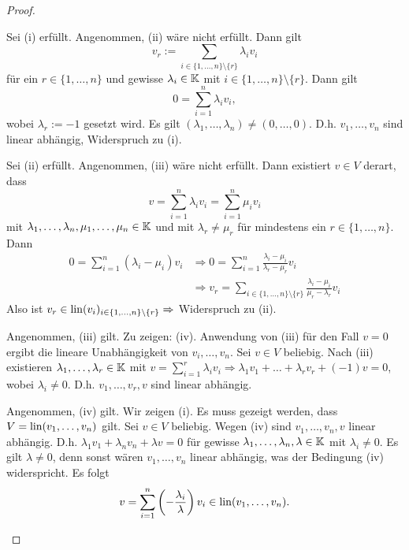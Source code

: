\begin{proof}
\begin{description}[font=\normalfont]
	\item[(i) $ \Rightarrow $ (ii):]
	Sei (i) erfüllt. Angenommen, (ii) wäre nicht erfüllt. Dann gilt 
	\[ v_r := \sum_{i \in \{ 1, \ldots, n \} \setminus \{ r \}} \lambda_iv_i 
	\] für ein $ r \in \{ 1, \ldots, n \} $ und gewisse $ \lambda_i \in \mathbb K $ mit $ i \in \{ 1, \ldots, n \} \setminus \{ r \} $. Dann gilt 
	\[ 0 = \sum_{i = 1}^n \lambda_iv_i ,\] wobei $ \lambda_r := -1 $ gesetzt wird. Es gilt $ (\lambda_1, \ldots, \lambda_n) \neq (0, \ldots, 0) $. D.h. $ v_1, \ldots, v_n $ sind linear abhängig, Widerspruch zu (i).
	
	\item[(ii) $ \Rightarrow $ (iii):]
	Sei (ii) erfüllt. Angenommen, (iii) wäre nicht erfüllt. Dann existiert $ v \in V $ derart, dass 
	\[ v = \sum_{i=1}^n \lambda_iv_i = \sum_{i=1}^n \mu_iv_i 
	\]
	 mit $ \lambda_1, \ldots, \lambda_n, \mu_1, \ldots, \mu_n \in \mathbb K $ und mit $ \lambda_r \neq \mu_r $ für mindestens ein $ r \in \{ 1, \ldots, n \} $. Dann 
	 \begin{align*} 0 = \sum_{i=1}^n (\lambda_i - \mu_i)v_i & \Rightarrow 0 = \sum_{i=1}^n \frac{\lambda_i - \mu_i}{\lambda_r - \mu_r}v_i \\ & \Rightarrow v_r = \sum_{i \in \{ 1, \ldots, n \} \setminus \{ r \}} \frac{\lambda_i - \mu_i}{\mu_r - \lambda_r}v_i 
	 \end{align*}
	 Also ist $v_r \in \operatorname{lin}(v_i)_{i \in \{ 1, \ldots, n \} \setminus \{ r \}} \Rightarrow$ Widerspruch zu (ii).
	
	\item[(iii) $ \Rightarrow $ (iv):]
	Angenommen, (iii) gilt. Zu zeigen: (iv). Anwendung von (iii) für den Fall $ v = 0 $ ergibt die lineare Unabhängigkeit von $ v_i, \ldots, v_n $. Sei $ v \in V $ beliebig. Nach (iii) existieren $ \lambda_1, \ldots, \lambda_r \in \mathbb K $ mit $ v = \sum_{i=1}^r \lambda_iv_i \Rightarrow \lambda_1v_1 + \ldots + \lambda_rv_r + (-1)v = 0 $, wobei $ \lambda_i \neq 0 $. D.h. $ v_1, \ldots, v_r, v $ sind linear abhängig.
	
	\item[(iv) $ \Rightarrow $ (i):]
	Angenommen, (iv) gilt. Wir zeigen (i). Es muss gezeigt werden, dass $ V = \operatorname{lin}(v_1, \ldots, v_n) $ gilt. Sei $ v \in V $ beliebig. Wegen (iv) sind $ v_1, \ldots, v_n, v $ linear abhängig. D.h. $ \lambda_1v_1 + \lambda_nv_n + \lambda v = 0 $ für gewisse $ \lambda_1, \ldots, \lambda_n, \lambda \in \mathbb K $ mit $ \lambda_i \neq 0 $. Es gilt $ \lambda \neq 0 $, denn sonst wären $ v_1, \ldots, v_n $ linear abhängig, was der Bedingung (iv) widerspricht. Es folgt \[
	 v =  \sum_{i=1}^n \left(-\frac{\lambda_i}{\lambda}\right)v_i \in \operatorname{lin}(v_1, \ldots, v_n) .\]
	  \qedhere
	 
\end{description}
\end{proof}


